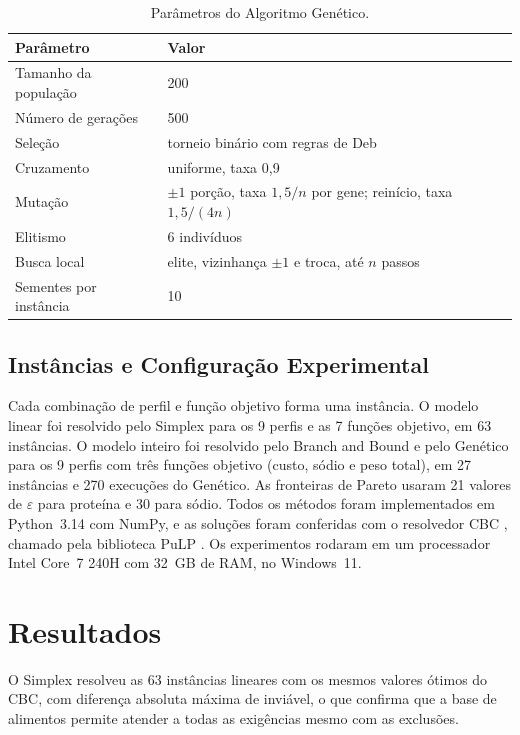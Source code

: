 \documentclass[12pt]{article}
\begin{document}
\begin{table}[ht]
\centering
\caption{Parâmetros do Algoritmo Genético.}\label{tab:parametros}
\footnotesize
\begin{tabular}{ll}
\toprule
Parâmetro & Valor \\
\midrule
Tamanho da população & 200 \\
Número de gerações & 500 \\
Seleção & torneio binário com regras de Deb \\
Cruzamento & uniforme, taxa 0,9 \\
Mutação & $\pm 1$ porção, taxa $1{,}5/n$ por gene; reinício, taxa $1{,}5/(4n)$ \\
Elitismo & 6 indivíduos \\
Busca local & elite, vizinhança $\pm 1$ e troca, até $n$ passos \\
Sementes por instância & 10 \\
\bottomrule
\end{tabular}
\end{table}

\subsection{Instâncias e Configuração Experimental}

Cada combinação de perfil e função objetivo forma uma instância. O modelo linear foi
resolvido pelo Simplex para os 9 perfis e as 7 funções objetivo, em 63 instâncias. O
modelo inteiro foi resolvido pelo Branch and Bound e pelo Genético para os 9 perfis com
três funções objetivo (custo, sódio e peso total), em 27 instâncias e 270 execuções do
Genético. As fronteiras de Pareto usaram 21 valores de $\varepsilon$ para proteína e 30
para sódio. Todos os métodos foram implementados em Python~3.14 com NumPy, e as
soluções foram conferidas com o resolvedor CBC \cite{forrest2005}, chamado pela
biblioteca PuLP \cite{mitchell2011}. Os experimentos rodaram em um processador Intel
Core~7 240H com 32~GB de RAM, no Windows~11.

\section{Resultados}\label{sec:resultados}

O Simplex resolveu as 63 instâncias lineares com os mesmos valores ótimos do CBC, com
diferença absoluta máxima de %
inviável, o que confirma que a base de alimentos permite atender a todas as exigências
mesmo com as exclusões.
\end{document}
